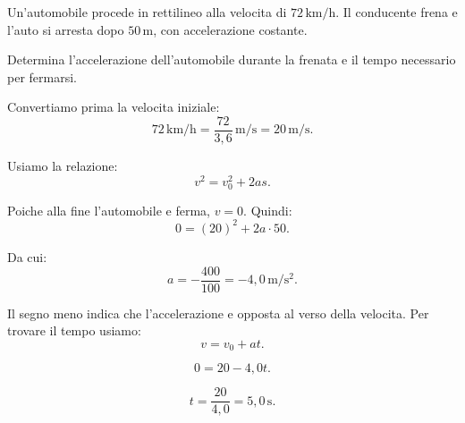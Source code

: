 
\begin{esercizio}
Un'automobile procede in rettilineo alla velocita di
\(72\,\mathrm{km/h}\). Il conducente frena e l'auto si arresta dopo
\(50\,\mathrm{m}\), con accelerazione costante.

Determina l'accelerazione dell'automobile durante la frenata e il tempo
necessario per fermarsi.
\end{esercizio}

\begin{soluzione}
Convertiamo prima la velocita iniziale:
\[
72\,\mathrm{km/h}=
\frac{72}{3{,}6}\,\mathrm{m/s}=20\,\mathrm{m/s}.
\]

Usiamo la relazione:
\[
v^2=v_0^2+2as.
\]

Poiche alla fine l'automobile e ferma, \(v=0\). Quindi:
\[
0=(20)^2+2a\cdot 50.
\]

Da cui:
\[
a=-\frac{400}{100}=-4{,}0\,\mathrm{m/s^2}.
\]

Il segno meno indica che l'accelerazione e opposta al verso della velocita.
Per trovare il tempo usiamo:
\[
v=v_0+at.
\]

\[
0=20-4{,}0t.
\]

\[
t=\frac{20}{4{,}0}=5{,}0\,\mathrm{s}.
\]
\end{soluzione}

